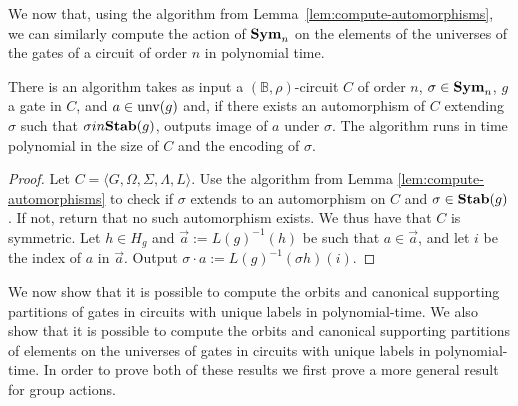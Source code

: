 \documentclass[../paper.tex]{subfiles}
\begin{document}
We now that, using the algorithm from Lemma~\ref{lem:compute-automorphisms}, we
can similarly compute the action of $\text{\textbf{Sym}}_n$ on the elements of the universes of
the gates of a circuit of order $n$ in polynomial time.

\begin{lem}
  There is an algorithm takes as input a $(\mathbb{B}, \rho)$-circuit $C$ of
  order $n$, $\sigma \in \text{\textbf{Sym}}_n$, $g$ a gate in $C$, and $a \in \text{unv}(g)$
  and, if there exists an automorphism of $C$ extending $\sigma$ such that
  $\sigma in \text{\textbf{Stab}}(g)$, outputs image of $a$ under $\sigma$. The algorithm runs
  in time polynomial in the size of $C$ and the encoding of $\sigma$.
  \label{lem:compute-automorphisms-labels}
\end{lem}
\begin{proof}
  Let $C = \langle G, \Omega, \Sigma, \Lambda, L \rangle$. Use the algorithm
  from Lemma \ref{lem:compute-automorphisms} to check if $\sigma$ extends to an
  automorphism on $C$ and $\sigma \in \text{\textbf{Stab}}(g)$. If not, return that no such
  automorphism exists. We thus have that $C$ is symmetric. Let $h \in H_g$ and
  $\vec{a} := L(g)^{-1}(h)$ be such that $a \in \vec{a}$, and let $i$ be the
  index of $a$ in $\vec{a}$. Output $\sigma \cdot a := L(g)^{-1}(\sigma h)(i)$.
\end{proof}

We now show that it is possible to compute the orbits and canonical supporting
partitions of gates in circuits with unique labels in polynomial-time. We also
show that it is possible to compute the orbits and canonical supporting
partitions of elements on the universes of gates in circuits with unique labels
in polynomial-time. In order to prove both of these results we first prove a
more general result for group actions.
\end{document}
